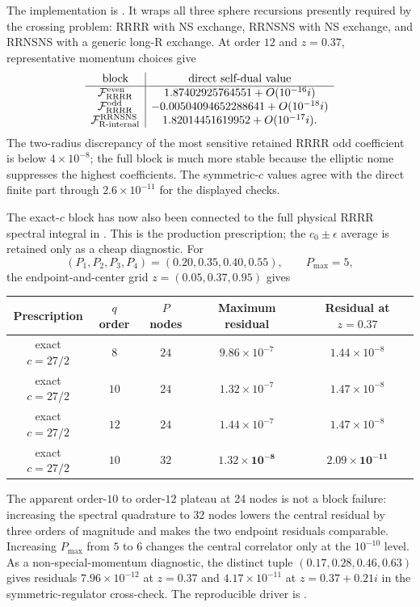 \documentclass[11pt]{article}
\newcommand{\NS}{\mathrm{NS}}
\newcommand{\R}{\mathrm{R}}
\newcommand{\F}{\mathcal F}
\begin{document}
The implementation is
.  It wraps all three sphere
recursions presently required by the crossing problem: RRRR with NS
exchange, RRNSNS with NS exchange, and RRNSNS with a generic long-R
exchange.  At order $12$ and $z=0.37$, representative momentum choices give
\begin{equation}
 \begin{array}{c|c}
 \text{block} & \text{direct self-dual value}\\
 \hline
 \F_{\R\R\R\R}^{\rm even}
 &1.87402925764551+O(10^{-16}i)\\
 \F_{\R\R\R\R}^{\rm odd}
 &-0.00504094652288641+O(10^{-18}i)\\
 \F_{\R\text{-internal}}^{\R\R\NS\NS}
 &1.82014451619952+O(10^{-17}i).
 \end{array}
 \label{eq:self-dual-order12-anchors}
\end{equation}
The two-radius discrepancy of the most sensitive retained RRRR odd
coefficient is below $4\times10^{-8}$; the full block is much more stable
because the elliptic nome suppresses the highest coefficients.  The
symmetric-$c$ values agree with the direct finite part through
$2.6\times10^{-11}$ for the displayed checks.

The exact-$c$ block has now also been connected to the full physical RRRR
spectral integral in .  This is the
production prescription; the $c_0\pm\epsilon$ average is retained only as a
cheap diagnostic.  For
\begin{equation}
 (P_1,P_2,P_3,P_4)=(0.20,0.35,0.40,0.55),\qquad P_{\max}=5,
 \label{eq:rrrr-exact-stress-point}
\end{equation}
the endpoint-and-center grid $z=(0.05,0.37,0.95)$ gives
\begin{center}
\begin{tabular}{@{}ccccc@{}}
\toprule
Prescription & $q$ order & $P$ nodes & Maximum residual
 & Residual at $z=0.37$\\
\midrule
exact $c=27/2$ & $8$ & $24$ & $9.86\times10^{-7}$
 & $1.44\times10^{-8}$\\
exact $c=27/2$ & $10$ & $24$ & $1.32\times10^{-7}$
 & $1.47\times10^{-8}$\\
exact $c=27/2$ & $12$ & $24$ & $1.44\times10^{-7}$
 & $1.47\times10^{-8}$\\
exact $c=27/2$ & $10$ & $32$ & $\mathbf{1.32\times10^{-8}}$
 & $\mathbf{2.09\times10^{-11}}$\\
\bottomrule
\end{tabular}
\end{center}
The apparent order-$10$ to order-$12$ plateau at 24 nodes is not a block
failure: increasing the spectral quadrature to 32 nodes lowers the central
residual by three orders of magnitude and makes the two endpoint residuals
comparable.  Increasing $P_{\max}$ from $5$ to $6$ changes the central
correlator only at the $10^{-10}$ level.  As a non-special-momentum
diagnostic, the distinct tuple
$(0.17,0.28,0.46,0.63)$ gives residuals $7.96\times10^{-12}$ at $z=0.37$
and $4.17\times10^{-11}$ at $z=0.37+0.21i$ in the symmetric-regulator
cross-check.  The reproducible driver is
.
\end{document}
